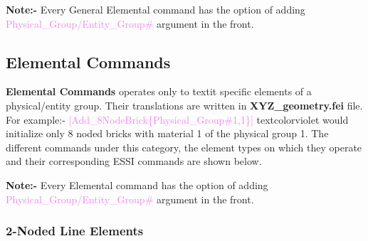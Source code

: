 \documentclass[11pt]{article}
\begin{document}
\noindent \textbf{Note:-} Every General Elemental command has the option of adding \textcolor{violet}{Physical\_Group/Entity\_Group\#} argument in the front.

\subsection{Elemental Commands}

\textbf{Elemental Commands} operates only to textit{ specific elements of a
physical/entity group}. Their translations are written in
\textbf{XYZ_geometry.fei} file. For example:-
\textcolor{violet}{[Add_8NodeBrick\{Physical_Group\#1,1\}]} textcolor{violet}{
would initialize only 8 noded bricks with material 1 of the physical group
1}. The different commands under this category, the element types on which
they operate and their corresponding ESSI commands are shown below.

\noindent \textbf{Note:-} Every Elemental command has the option of adding
\textcolor{violet}{Physical_Group/Entity_Group\#} argument in the front.

\subsubsection{2-Noded Line Elements}
\end{document}
